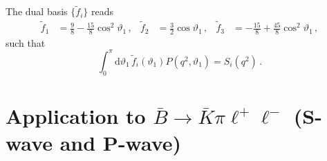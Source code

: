 \documentclass[aps,prd,reprint,nofootinbib,preprintnumbers]{revtex4}
\newcommand{\dual}[1]{\tilde{#1}}
\newcommand{\rmdx}[1]{\mbox{d} #1 \,} %
\renewcommand{\theta}{\vartheta}
\begin{document}
The dual basis $\lbrace \dual{f}_i\rbrace$ reads
\begin{equation}
\begin{aligned}
    \dual{f}_1 & = \frac{9}{8} - \frac{15}{8}\cos^2\theta_1\,, &
    \dual{f}_2 & = \frac{3}{2}\cos\theta_1\,, &
    \dual{f}_3 & = -\frac{15}{8} + \frac{45}{8}\cos^2\theta_1\,,
\end{aligned}
\end{equation}
such that
\begin{equation}
    \int_0^\pi \rmdx{\theta_1} \dual{f}_i(\theta_1) P(q^2, \theta_1) = S_i(q^2)\,.
\end{equation}

\section{Application to $\bar{B}\to\bar{K}\pi\ell^+\ell^-$ (S-wave and P-wave)}
\label{app:btokstarll}
\end{document}

